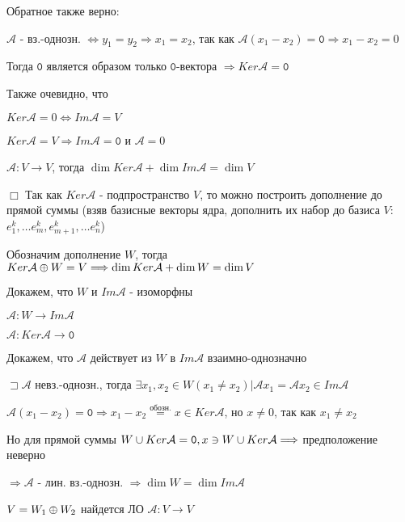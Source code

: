 \documentclass[12pt]{article}
\begin{document}
    \Nota Обратное также верно:

    $\mathcal{A}$ - вз.-однозн. $\Longleftrightarrow y_1 = y_2 \Longrightarrow x_1 = x_2$, так как $\mathcal{A}(x_1 - x_2) = \texttt{0} \Longrightarrow x_1 - x_2 = 0$

    Тогда $\texttt{0}$ является образом только $\texttt{0}$-вектора $\Longrightarrow Ker \mathcal{A} = \texttt{0}$

    \Nota Также очевидно, что

    $Ker \mathcal{A} = 0 \Longleftrightarrow Im \mathcal{A} = V$

    $Ker \mathcal{A} = V \Longrightarrow Im \mathcal{A} = \texttt{0}$ и $\mathcal{A} = 0$

    \hypertarget{theoremaboutdimensions}{}

    \Th $\mathcal{A} : V \rightarrow V$, тогда $\dim Ker \mathcal{A} + \dim Im \mathcal{A} = \dim V$

    $\Box$ Так как $Ker \mathcal{A}$ - подпространство $V$, то можно построить дополнение до прямой суммы (взяв базисные векторы ядра, дополнить их набор до базиса $V$: $e^k_1, \dots e^k_m, e^k_{m+1}, \dots e^k_n$)

    Обозначим дополнение $W$, тогда $Ker \mathcal{A} \oplus W = V \Longrightarrow \dim Ker \mathcal{A} + \dim W = \dim V$

    Докажем, что $W$ и $Im \mathcal{A}$ - изоморфны

    $\mathcal{A} : W \rightarrow Im \mathcal{A}$

    $\mathcal{A} : Ker \mathcal{A} \rightarrow \texttt{0}$

    Докажем, что $\mathcal{A}$ действует из $W$ в $Im \mathcal{A}$ взаимно-однозначно

    $\sqsupset \mathcal{A}$ невз.-однозн., тогда $\exists x_1, x_2 \in W (x_1 \neq x_2) | \mathcal{A}x_1 = \mathcal{A}x_2 \in Im \mathcal{A}$

    $\mathcal{A}(x_1 - x_2) = \texttt{0} \Longrightarrow x_1 - x_2 \stackrel{\text{обозн.}}{=} x \in Ker \mathcal{A}$, но $x \neq 0$, так как $x_1 \neq x_2$

    Но для прямой суммы $W \cup Ker \mathcal{A} = \texttt{0}, x \ni W \cup Ker \mathcal{A} \Longrightarrow$ предположение неверно

    $\Longrightarrow \mathcal{A}$ - лин. вз.-однозн. $\Longrightarrow \dim W = \dim Im \mathcal{A}$

    $V = W_1 \oplus W_2$ найдется ЛО $\mathcal{A} : V \rightarrow V$
\end{document}
